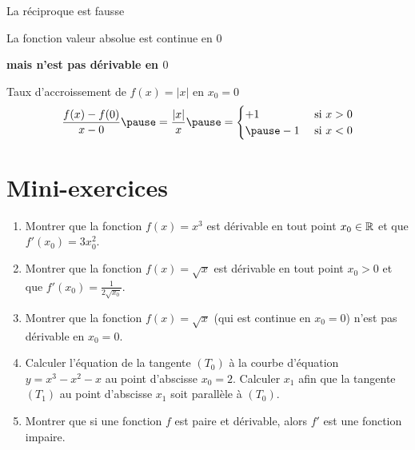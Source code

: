 \begin{frame}

\centerline{La réciproque est \alert{fausse}}

\pause

\begin{exemple}
\centerline{La fonction valeur absolue est continue en $0$}

\centerline{\textbf{mais n'est pas dérivable en $0$}}
  
\pause


\pause

Taux d'accroissement de $f(x)=|x|$ en $x_0=0$ 
$$\frac{f(x)-f(0)}{x-0} \pause= \frac{|x|}{x} \pause
=
\begin{cases}

+1 & \text{ si } x>0 \\
\pause
-1 & \text{ si } x < 0 \\
\end{cases}
$$
\vspace*{-2ex}
\end{exemple}


\end{frame}

\section*{Mini-exercices}


\begin{frame}
\begin{miniexercice}
\begin{enumerate}
  \item Montrer que la fonction $f(x)=x^3$ est dérivable en tout point $x_0\in \mathbb{R}$ et que $f'(x_0)=3x_0^2$.
  \item Montrer que la fonction $f(x)=\sqrt x$ est dérivable en tout point $x_0 >0$ et que $f'(x_0)=\frac{1}{2\sqrt{x_0}}$.
  \item Montrer que la fonction $f(x)=\sqrt x$ (qui est continue en $x_0=0$) n'est pas dérivable en $x_0=0$.
  \item Calculer l'équation de la tangente $(T_0)$ à la courbe d'équation $y=x^3-x^2-x$ au point d'abscisse $x_0=2$.
Calculer $x_1$ afin que la tangente $(T_1)$ au point d'abscisse $x_1$ soit parallèle à $(T_0)$.
  \item Montrer que si une fonction $f$ est paire et dérivable, alors $f'$ est une fonction impaire.
\end{enumerate}
\end{miniexercice}
\end{frame}



